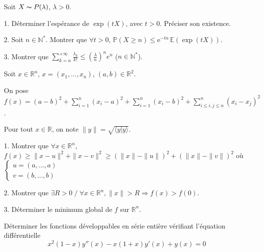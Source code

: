\subetoiles
\columnbreak



\noindent Soit $X \thicksim P(\lambda)$, $\lambda > 0$.

\vspace{5pt}
1. Déterminer l'espérance de $\exp(tX)$, avec $t > 0$. Préciser son existence.

\vspace{5pt}
2. Soit $n \in \mathbb{N}^*$. Montrer que $\forall t > 0$, $\mathbb{P}(X \geqslant n) \leqslant \mathrm{e}^{-tn}\,\mathbb{E}(\exp(tX))$.

\vspace{5pt}
3. Montrer que $\displaystyle \sum_{k = n}^{+\infty} \frac {\lambda_k} {k!} \leqslant \left( \frac {\lambda} {n} \right)^ne^n$ ($n \in \mathbb{N}^*$).



\subetoiles



\noindent Soit $x \in \mathbb{R}^n$, $x = (x_1, ..., x_n)$, $(a,b) \in \mathbb{R}^2$.

\noindent On pose $\displaystyle f(x) = (a-b)^2 + \sum_{i=1}^{n}(x_i-a)^2 + \sum_{i=1}^{n}(x_i-b)^2 + \sum_{i \leqslant i,j \leqslant n}^{n}(x_i-x_j)^2$.

\noindent Pour tout $x \in \mathbb{R}$, on note $\displaystyle \|y\| = \sqrt{\langle y|y \rangle}$.

\vspace{10pt}
1. Montrer que $\forall x \in \mathbb{R}^n$, $\displaystyle f(x) \geqslant \|x-u\|^2 +  \|x-v\|^2 \geqslant (\|x\| - \|u\|)^2 + (\|x\| - \|v\|)^2$
où $
\begin{cases}
  u = (a, ..., a) & \\    
  v = (b, ..., b) &
\end{cases}$

\vspace{5pt}
2. Montrer que $\exists R > 0 \;/\; \forall x \in \mathbb{R}^n, \|x\| > R \Rightarrow f(x) > f(0)$.

\vspace{5pt}
3. Déterminer le minimum global de $f$ sur $\mathbb{R}^n$.



\subetoiles



\noindent Déterminer les fonctions développables en série entière vérifiant l'équation différentielle
\begin{equation*}
  x^2(1-x)y''(x) - x(1+x)y'(x) + y(x) = 0
\end{equation*}



